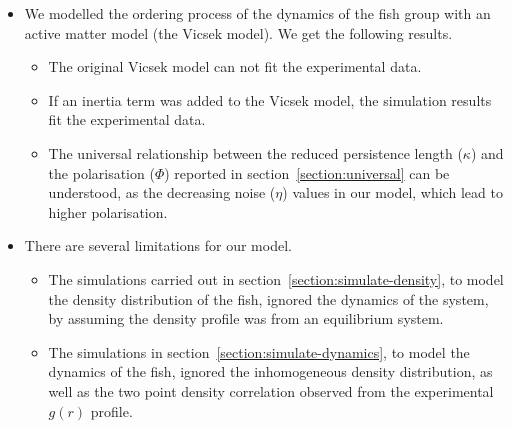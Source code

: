 \documentclass[11pt,twoside]{report}
\begin{document}
\begin{adjustwidth}{0cm}{-5cm}
\begin{tcolorbox}[
title=Summary of Chapter~6,
fonttitle=\sffamily\Large,
right=0.1\linewidth,
enlarge bottom by=0.5em,
enlarge top by=0.5em,
]
\begin{itemize}
	\item We modelled the ordering process of the dynamics of the fish group with an active matter model (the Vicsek model). We get the following results.
	\begin{itemize}
		\item The original Vicsek model can not fit the experimental data.
		\item If an inertia term was added to the Vicsek model, the simulation results fit the experimental data.
		\item The universal relationship between the reduced persistence length ($\kappa$) and the polarisation ($\Phi$) reported in section~\ref{section:universal} can be understood, as the decreasing noise ($\eta$) values in our model, which lead to higher polarisation.
	\end{itemize}
	\item There are several limitations for our model.
	\begin{itemize}
		\item  The simulations carried out in section~\ref{section:simulate-density}, to model the density distribution of the fish, ignored the dynamics of the system, by assuming the density profile was from an equilibrium system.
		\item The simulations in section~\ref{section:simulate-dynamics}, to model the dynamics of the fish, ignored the inhomogeneous density distribution, as well as the two point density correlation observed from the experimental $g(r)$ profile.
	\end{itemize}
\end{itemize}
\end{tcolorbox}
\end{adjustwidth}
%
%
%
%
\end{document}
